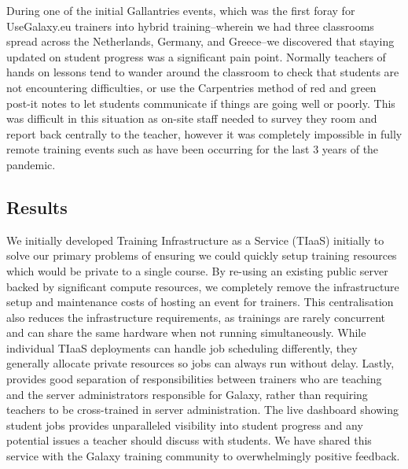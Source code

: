 \documentclass[a4paper,num-refs]{oup-contemporary}
\begin{document}
During one of the initial Gallantries events, which was the first foray for UseGalaxy.eu trainers into hybrid training--wherein we had three classrooms spread across the Netherlands, Germany, and Greece--we discovered that staying updated on student progress was a significant pain point. Normally teachers of hands on lessons tend to wander around the classroom to check that students are not encountering difficulties, or use the Carpentries method of red and green post-it notes to let students communicate if things are going well or poorly. This was difficult in this situation as on-site staff needed to survey they room and report back centrally to the teacher, however it was completely impossible in fully remote training events such as have been occurring for the last 3 years of the pandemic.

\subsection{Results}

We initially developed Training Infrastructure as a Service (TIaaS) initially to solve our primary problems of ensuring we could quickly setup training resources which would be private to a single course. By re-using an existing public server backed by significant compute resources, we completely remove the infrastructure setup and maintenance costs of hosting an event for trainers. This centralisation also reduces the infrastructure requirements, as trainings are rarely concurrent and can share the same hardware when not running simultaneously. While individual TIaaS deployments can handle job scheduling differently, they generally allocate private resources so jobs can always run without delay. Lastly, provides good separation of responsibilities between trainers who are teaching and the server administrators responsible for Galaxy, rather than requiring teachers to be cross-trained in server administration. The live dashboard showing student jobs provides unparalleled visibility into student progress and any potential issues a teacher should discuss with students. We have shared this service with the Galaxy training community to overwhelmingly positive feedback.
\end{document}
